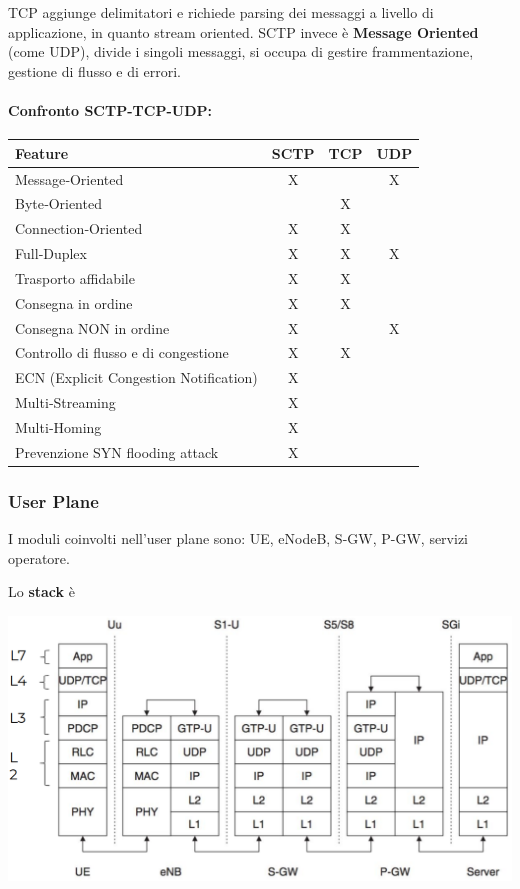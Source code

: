 TCP aggiunge delimitatori e richiede parsing dei messaggi a livello di applicazione, in quanto stream oriented. SCTP invece è \textbf{Message Oriented} (come UDP), divide i singoli messaggi, si occupa di gestire frammentazione, gestione di flusso e di errori.

\paragraph{Confronto SCTP-TCP-UDP:}
\begin{center}
	\begin{tabular}{lccc}
		\toprule
		\textbf{Feature} & \textbf{SCTP} & \textbf{TCP} & \textbf{UDP} \\
		\midrule
		Message‐Oriented                              & X &   & X \\
		Byte‐Oriented                                 &   & X &   \\
		Connection‐Oriented                           & X & X &   \\
		Full‐Duplex                                   & X & X & X \\
		Trasporto affidabile                          & X & X &   \\
		Consegna in ordine                            & X & X &   \\
		Consegna NON in ordine               & X &   & X \\
		Controllo di flusso e di congestione          & X & X &   \\
		ECN (Explicit Congestion Notification)        & X &   &   \\
		Multi‐Streaming                               & X &   &   \\
		Multi‐Homing                                  & X &   &   \\
		Prevenzione SYN flooding attack               & X &   &   \\
		\bottomrule
	\end{tabular}
\end{center}

\subsubsection{User Plane}

I moduli coinvolti nell'user plane sono: UE, eNodeB, S-GW, P-GW, servizi operatore.

Lo \textbf{stack} è 
\begin{center}
	\includegraphics[width=0.95\linewidth]{img/4g/ups}
\end{center}

